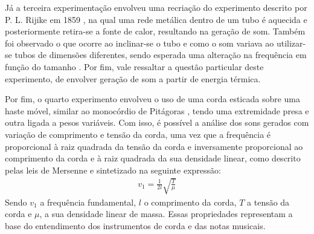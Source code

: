 Já a terceira experimentação envolveu uma recriação do experimento descrito por P. L. Rijike em 1859 \cite{Rijke_1859}, na qual uma rede metálica dentro de um tubo é aquecida e posteriormente retira-se a fonte de calor, resultando na geração de som. Também foi observado o que ocorre ao inclinar-se o tubo e como o som variava ao utilizar-se tubos de dimensões diferentes, sendo esperada uma alteração na frequência em função do tamanho \cite{sarpotdar2003rijke}. Por fim, vale ressaltar a questão particular deste experimento, de envolver geração de som a partir de energia térmica.

Por fim, o quarto experimento envolveu o uso de uma corda esticada sobre uma haste móvel, similar ao monocórdio de Pitágoras \cite{inbook0dd942e5}, tendo uma extremidade presa e outra ligada a pesos variáveis. Com isso, é possível a análise dos sons gerados com variação de comprimento e tensão da corda, uma vez que a frequência é proporcional à raiz quadrada da tensão da corda e inversamente proporcional ao comprimento da corda e à raiz quadrada da sua densidade linear, como descrito pelas leis de Mersenne \cite{Nussenzveig_2014} e sintetizado na seguinte expressão: 
\begin{align*}
	v_1 = \frac{1}{2l} \sqrt{\frac{T}{\mu}}
\end{align*}
Sendo \(v_1\) a frequência fundamental, \(l\) o comprimento da corda, \(T\) a tensão da corda e \( \mu\), a sua densidade linear de massa.
Essas propriedades representam a base do entendimento dos instrumentos de corda e das notas musicais.
